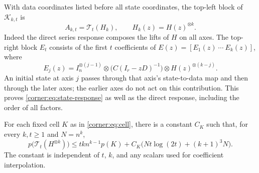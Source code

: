 With data coordinates listed before all state coordinates, the
top-left block of $\mathcal K_{k,t}$ is
\[
 A_{k,t}=\mathcal T_t(H_k),\qquad H_k(z)=H(z)^{\otimes k}.
\]
Indeed the direct series response composes the lifts of $H$ on all
axes.  The top-right block $E_t$ consists of the first $t$ coefficients
of $E(z)=[E_1(z)\ \cdots\ E_k(z)]$, where
\begin{equation}
 E_j(z)=I_n^{\otimes(j-1)}\otimes
        \bigl(C(I_r-zD)^{-1}\bigr)\otimes H(z)^{\otimes(k-j)}.
 \label{corner:eq:state-response}
\end{equation}
An initial state at axis $j$ passes through that axis's state-to-data
map and then through the later axes; the earlier axes do not act on
this contribution.  This proves \cref{corner:eq:state-response} as
well as the direct response, including the order of all factors.

\begin{lemma}
\label{corner:lem:cascade}
For each fixed cell $K$ as in \cref{corner:eq:cell}, there is a constant $C_K$
such that, for every $k,t\ge1$ and $N=n^k$,
\begin{equation}
 p\bigl(\mathcal T_t(H^{\otimes k})\bigr)
 \le tk n^{k-1}p(K)
       +C_K\bigl(Nt\log(2t)+(k+1)^3N\bigr).
 \label{corner:eq:cascade-bound}
\end{equation}
The constant is independent of $t$, $k$, and any scalars used for
coefficient interpolation.
\end{lemma}

